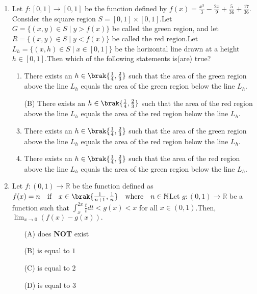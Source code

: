 \documentclass[12pt,a4paper]{article}
\begin{document}
\begin{enumerate}
\item Let $f : [0,1] \to [0,1]$ be the function defined by $
f(x) = \frac{x^3}{3} - \frac{2x}{9} + \frac{5}{36} + \frac{17}{36}.$ Consider the square region $S = [0,1] \times [0,1]$.Let$ G = \{(x,y) \in S \mid y > f(x) \} $ be called the green region, and let $ R = \{(x,y) \in S \mid y < f(x) \} $ be called the red region.Let $ L_h = \{(x,h) \in S \mid x \in [0,1] \} $
be the horizontal line drawn at a height $h \in [0,1]$.Then which of the following statements is(are) true?
\begin{enumerate}
\item There exists an $h \in \brak{\frac{1}{4}, \frac{2}{3}}$ such that the area of the green region above the line $L_h$ equals the area of the green region below the line $L_h$.\item[(B)] There exists an $h \in \brak{\frac{1}{4}, \frac{2}{3}}$ such that the area of the red region above the line $L_h$ equals the area of the red region below the line $L_h$. 
\item There exists an $h \in \brak{\frac{1}{4}, \frac{2}{3}}$ such that the area of the green region above the line $L_h$ equals the area of the red region below the line $L_h$.  
	\item There exists an $h \in \brak{\frac{1}{4}, \frac{2}{3}}$ such that the area of the red region above the line $L_h$ equals the area of the green region below the line $L_h$.  
\end{enumerate}

\item Let $f : (0,1) \to \mathbb{R}$ be the function defined as $ f(x) = n \quad \text{if} \quad x \in \brak{\frac{1}{n+1}, \frac{1}{n}} \quad \text{where} \quad n \in \mathbb{N}
$Let $g : (0,1) \to \mathbb{R}$ be a function such that $ \int_x^{2x} \frac{t}{t} dt < g(x) < x $ for all $x \in (0,1)$.Then, $ \lim_{x \to 0} (f(x) - g(x)).$
\begin{enumerate}
\item[(A)] does \textbf{NOT} exist  
\item[(B)] is equal to $1$  
\item[(C)] is equal to $2$  
\item[(D)] is equal to $3$  
\end{enumerate}


\end{enumerate}
\end{document}
